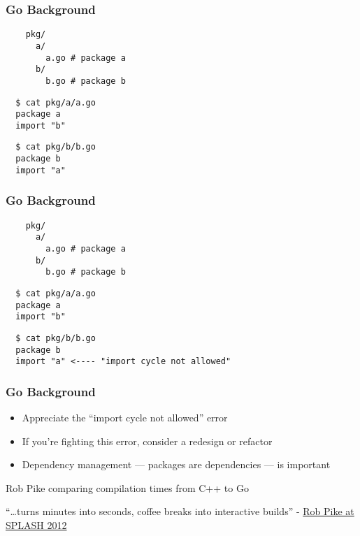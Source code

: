 
{
  \color{solarizedBase2}
\begin{frame}[fragile]
  \frametitle{Go Background}

  \begin{verbatim}
    pkg/
      a/
        a.go # package a
      b/
        b.go # package b
  \end{verbatim}

  \begin{verbatim}
  $ cat pkg/a/a.go
  package a
  import "b"
  \end{verbatim}

  \begin{verbatim}
  $ cat pkg/b/b.go
  package b
  import "a"
  \end{verbatim}

\end{frame}
}

{
  \color{solarizedBase2}
\begin{frame}[fragile]
  \frametitle{Go Background}

  \begin{verbatim}
    pkg/
      a/
        a.go # package a
      b/
        b.go # package b
  \end{verbatim}

  \begin{verbatim}
  $ cat pkg/a/a.go
  package a
  import "b"
  \end{verbatim}

  \begin{verbatim}
  $ cat pkg/b/b.go
  package b
  import "a" <---- "import cycle not allowed"
  \end{verbatim}

\end{frame}
}

{
  \color{solarizedBase2}
\begin{frame}
  \frametitle{Go Background}

  \begin{itemize}
    \item Appreciate the ``import cycle not allowed'' error
    \item If you're fighting this error, consider a redesign or refactor
    \item Dependency management --- packages are dependencies --- is important
  \end{itemize}

  \vspace{1em}
  \small
  Rob Pike comparing compilation times from C++ to Go

  \vspace{1em}
  ``\dots turns minutes into seconds, coffee breaks into interactive builds''
  - \href{https://talks.golang.org/2012/splash.article}{Rob Pike at SPLASH 2012}
\end{frame}
}
